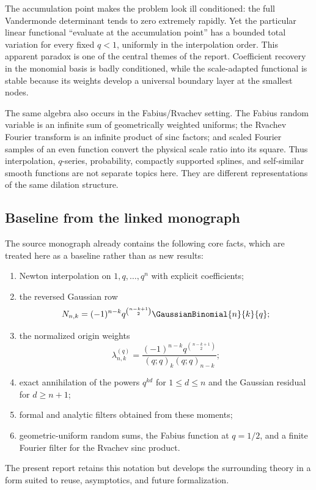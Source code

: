 \documentclass[11pt,oneside]{article}
\numberwithin{equation}{section}
\theoremstyle{definition}
\theoremstyle{remark}
\begin{document}
The accumulation point makes the problem look ill conditioned: the full
Vandermonde determinant tends to zero extremely rapidly.  Yet the particular
linear functional ``evaluate at the accumulation point'' has a bounded total
variation for every fixed $q<1$, uniformly in the interpolation order.  This
apparent paradox is one of the central themes of the report.  Coefficient
recovery in the monomial basis is badly conditioned, while the scale-adapted
functional is stable because its weights develop a universal boundary layer at
the smallest nodes.

The same algebra also occurs in the Fabius/Rvachev setting.  The Fabius random
variable is an infinite sum of geometrically weighted uniforms; the Rvachev
Fourier transform is an infinite product of sinc factors; and scaled Fourier
samples of an even function convert the physical scale ratio into its square.
Thus interpolation, $q$-series, probability, compactly supported splines, and
self-similar smooth functions are not separate topics here.  They are different
representations of the same dilation structure.

\subsection{Baseline from the linked monograph}

The source monograph \cite{ProveItMonograph} already contains the following
core facts, which are treated here as a baseline rather than as new results:
\begin{enumerate}[label=(\roman*),leftmargin=2em]
\item Newton interpolation on $1,q,\ldots,q^n$ with explicit coefficients;
\item the reversed Gaussian row
\[
  N_{n,k}=(-1)^{n-k}q^{\binom{n-k+1}{2}}\GaussianBinomial{n}{k}{q};
\]
\item the normalized origin weights
\[
  \lambda_{n,k}^{(q)}=
  \frac{(-1)^{n-k}q^{\binom{n-k+1}{2}}}
       {(q;q)_k(q;q)_{n-k}};
\]
\item exact annihilation of the powers $q^{kd}$ for $1\le d\le n$ and the
Gaussian residual for $d\ge n+1$;
\item formal and analytic filters obtained from these moments;
\item geometric-uniform random sums, the Fabius function at $q=1/2$, and a
finite Fourier filter for the Rvachev sinc product.
\end{enumerate}
The present report retains this notation but develops the surrounding theory in
a form suited to reuse, asymptotics, and future formalization.
\end{document}
